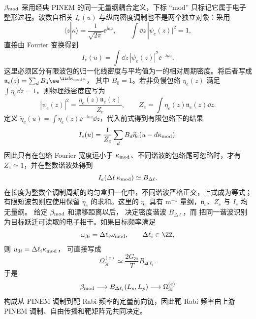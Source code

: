 $\beta_{\rm mod}$ 采用经典 PINEM 的同一无量纲耦合定义，下标 ``mod'' 只标记它属于电子整形过程。波数自相关 $I_e(u)$ 与纵向密度调制也不是两个独立对象：采用
\begin{equation*}
 \langle z|\kappa\rangle=\frac{1}{\sqrt{2\pi}}\ee^{\ii \kappa z},
 \qquad
 \int\dd z\,|\psi_e(z)|^2=1,
\end{equation*}
直接由 Fourier 变换得到
\begin{equation}
{
 I_e(u)=\int\dd z\,|\psi_e(z)|^2\ee^{-\ii uz}.}
\label{eq:electron_coherence_density_fourier_dp46}
\end{equation}
这里必须区分有限波包的归一化线密度与平均值为一的相对周期密度。将后者写成
$\mathfrak n_e(z)=\sum_dB_d\ee^{\ii d\kappa_{\rm mod}z}$，
其中 $B_0=1$。若非负慢包络 $\eta_e(z)$ 满足 $\int\eta_e\dd z=1$，则物理线密度应写为
\begin{equation*}
 |\psi_e(z)|^2=\frac{\eta_e(z)\mathfrak n_e(z)}{Z_e},\qquad
 Z_e=\int\eta_e(z)\mathfrak n_e(z)\dd z.
\end{equation*}
定义 $\widetilde\eta_e(u)=\int\eta_e(z)\ee^{-\ii uz}\dd z$，代入前式得到有限包络下的结果
\begin{equation*}
 I_e(u)=\frac1{Z_e}\sum_d B_d\widetilde\eta_e(u-d\kappa_{\rm mod}).
\end{equation*}
因此只有在包络 Fourier 宽度远小于 $\kappa_{\rm mod}$、不同谐波的包络尾可忽略时，才有 $Z_e\simeq1$，并在整数谐波处得到
\begin{equation}
{
 I_e(\Delta\ell\,\kappa_{\rm mod})\simeq B_{\Delta\ell}.}
\label{eq:electron_coherence_equals_bunching_dp46}
\end{equation}
在长度为整数个调制周期的均匀盒归一化中，不同谐波严格正交，上式成为等式；有限短波包则应使用保留 $\widetilde\eta_e$ 的求和。这里的 $\eta_e$ 具有 $\mathrm{m^{-1}}$ 量纲，$\mathfrak n_e$、$Z_e$ 与 $I_e$ 均无量纲。
给定 $\beta_{\rm mod}$ 和漂移距离以后， 决定密度谐波 $B_{\Delta\ell}$，而 把同一谐波识别为目标跃迁可读取的电子相干。如果目标频率满足
\begin{equation*}
 \omega_{3i}=\Delta\ell_i\omega_{\rm mod},
 \qquad \Delta\ell_i\in\ZZ,
\end{equation*}
则 $u_{3i}=\Delta\ell_i \kappa_{\rm mod}$， 可直接写成
\begin{equation}
{
 \Omega_{3i}^{(e)}
 \simeq\frac{2G_{3i}}{T}B_{\Delta\ell_i}.}
\label{eq:electron_rabi_from_bunching_dp46}
\end{equation}
于是
\begin{equation*}
 \beta_{\rm mod}
 \longrightarrow B_{\Delta\ell_i}(L_s,L_p)
 \longrightarrow\Omega_{3i}^{(e)}
\end{equation*}
构成从 PINEM 调制到靶 Rabi 频率的定量前向链，因此靶 Rabi 频率由上游 PINEM 调制、自由传播和靶矩阵元共同决定。

